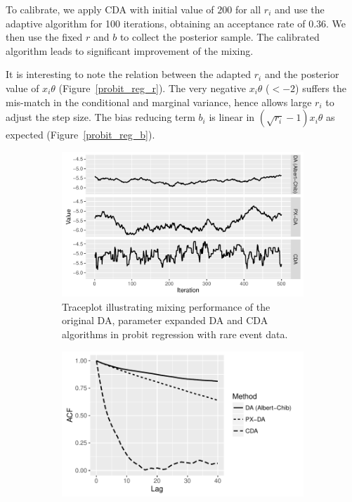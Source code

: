 \documentclass[10pt]{article}
\newcommand{\xbeta}{ x_i \theta}
\begin{document}
To calibrate, we apply CDA with initial value of $200$ for all $r_i$ and use the adaptive algorithm for 100 iterations, obtaining an acceptance rate of $0.36$. We then use the fixed $r$ and $b$ to collect the posterior sample. The calibrated algorithm leads to significant improvement of the mixing.

It is interesting to note the relation between the adapted $r_i$ and the posterior value of $\xbeta$ (Figure~\ref{probit_reg_r}). The very negative $\xbeta$ ($< -2$) suffers the mis-match in the conditional and marginal variance, hence allows large $r_i$ to adjust the step size. The bias reducing term $b_i$ is linear in $(\sqrt{r_i}-1 ) \xbeta$ as expected (Figure~\ref{probit_reg_b}).
 
 
\begin{figure}[H]
  \begin{subfigure}[b]{0.32\textwidth}
 \includegraphics[width=1\textwidth]{probit15_trace_plot.pdf}
  \caption{Traceplot illustrating mixing performance of the original DA, parameter expanded DA and CDA algorithms in probit regression with rare event data.}
  \label{probit_reg_trace}
\end{subfigure}
  \hfill
   \begin{subfigure}[b]{0.32\textwidth}
 \includegraphics[width=1\textwidth]{probit15_acf.pdf}

\end{subfigure}
\end{figure}
\end{document}
